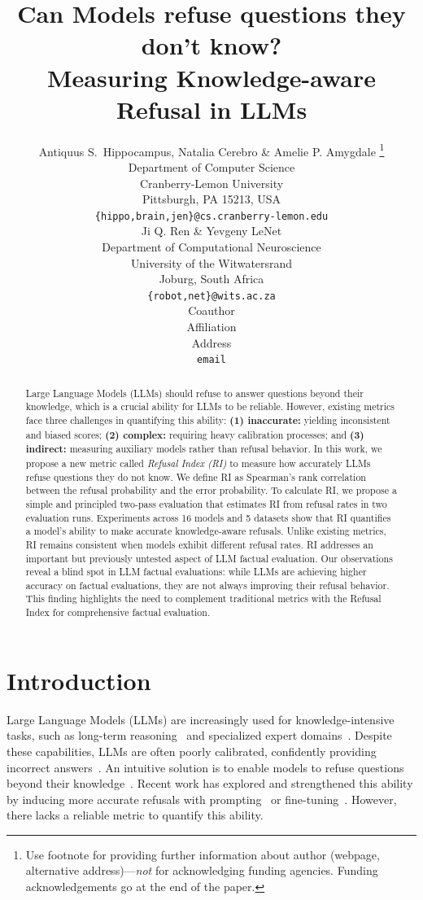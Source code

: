 \documentclass{article} %
\title{Can Models refuse questions they don't know? \\ Measuring Knowledge-aware Refusal in LLMs}
\author{Antiquus S.~Hippocampus, Natalia Cerebro \& Amelie P. Amygdale \thanks{ Use footnote for providing further information
about author (webpage, alternative address)---\emph{not} for acknowledging
funding agencies.  Funding acknowledgements go at the end of the paper.} \\
Department of Computer Science\\
Cranberry-Lemon University\\
Pittsburgh, PA 15213, USA \\
\texttt{\{hippo,brain,jen\}@cs.cranberry-lemon.edu} \\
\And
Ji Q. Ren \& Yevgeny LeNet \\
Department of Computational Neuroscience \\
University of the Witwatersrand \\
Joburg, South Africa \\
\texttt{\{robot,net\}@wits.ac.za} \\
\AND
Coauthor \\
Affiliation \\
Address \\
\texttt{email}
}
\theoremstyle{definition}
\begin{document}
\maketitle

\begin{abstract}
Large Language Models (LLMs) should refuse to answer questions beyond their knowledge, which is a crucial ability for LLMs to be reliable. 
However, existing metrics face three challenges in quantifying this ability: 
\textbf{(1) inaccurate:} yielding inconsistent and biased scores; 
\textbf{(2) complex:} requiring heavy calibration processes; 
and \textbf{(3) indirect:} measuring auxiliary models rather than refusal behavior. 
In this work, we propose a new metric called \emph{Refusal Index (RI)} to measure how accurately LLMs refuse questions they do not know. 
We define RI as Spearman's rank correlation between the refusal probability and the error probability. 
To calculate RI, we propose a simple and principled two-pass evaluation that estimates RI from refusal rates in two evaluation runs. 
Experiments across 16 models and 5 datasets show that RI quantifies a model's ability to make accurate knowledge-aware refusals. Unlike existing metrics, RI remains consistent when models exhibit different refusal rates.
RI addresses an important but previously untested aspect of LLM factual evaluation. 
Our observations reveal a blind spot in LLM factual evaluations: 
while LLMs are achieving higher accuracy on factual evaluations, they are not always improving their refusal behavior. 
This finding highlights the need to complement traditional metrics with the Refusal Index for comprehensive factual evaluation.

\end{abstract}

\section{Introduction}
\label{sec:intro}

Large Language Models (LLMs) are increasingly used for knowledge-intensive tasks, such as long-term reasoning~\citep{chen2025reasoningerasurveylong} and specialized expert domains~\citep{wang2025capabilitiesgpt5multimodalmedical,gu2024legalagentbench,mahdavi2025brains}. 
Despite these capabilities, LLMs are often poorly calibrated, confidently providing incorrect answers~\citep{Huang_2025}. 
An intuitive solution is to enable models to refuse questions beyond their knowledge~\citep{yin2023large}. 
Recent work has explored and strengthened this ability by inducing more accurate refusals with prompting~\citep{cheng2024aiassistantsknowdont, kadavathLanguageModelsMostly2022} or fine-tuning~\citep{zhang2024rtuninginstructinglargelanguage, kapoor2024large}. However, there lacks a reliable metric to quantify this ability.
\end{document}
